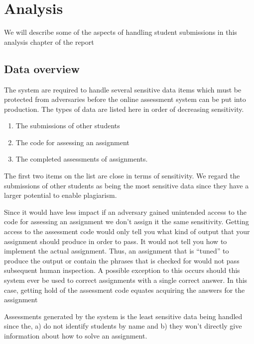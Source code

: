 \chapter{Analysis}
We will describe some of the aspects of handling student submissions
in this analysis chapter of the report

\section{Data overview}

The system are required to handle  several sensitive data items which must be
protected from adversaries before the online assessment system can be
put into production. The types of data are listed here in order of
decreasing sensitivity.

\begin{enumerate}
  \item The submissions of other students
  \item The code for assessing an assignment
  \item The completed assessments of assignments.
\end{enumerate}

The first two items on the list are close in terms of
sensitivity. We regard the submissions of other students as being the
most sensitive data since they have a larger potential to enable
plagiarism.

Since it would have less impact if an adversary gained unintended access
to the code for assessing an assignment we don't assign it the same
sensitivity. Getting access to the assessment code would only tell you
what kind of output that your assignment should produce in order to
pass. It would not tell you how to implement the actual assignment. Thus,
an assignment that is "`tuned"' to produce the output or contain the
phrases that is checked for would not pass subsequent human
inspection. A possible exception to this occurs should this system
ever be used to correct assignments with a single correct answer. In
this case, getting hold of the assessment code equates acquiring the
answers for the assignment


Assessments generated by the system is the least sensitive data being
handled since the, a) do not identify students by name and b) they
won't directly give information about how to solve an assignment.

